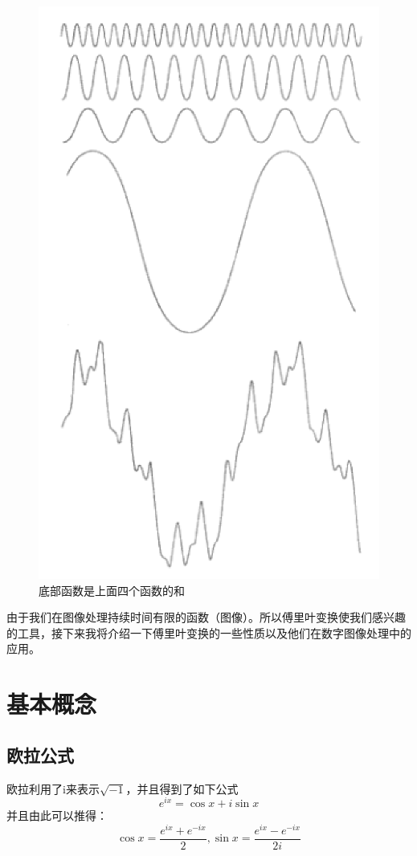\documentclass[UTF8,a4paper]{ctexart}
\begin{document}
\begin{figure}[ht]
	\centering
	\includegraphics[scale=0.6]{pic1.png}
	\caption{底部函数是上面四个函数的和}
\end{figure}
由于我们在图像处理持续时间有限的函数（图像）。所以傅里叶变换使我们感兴趣的工具，接下来我将介绍一下傅里叶变换的一些性质以及他们在数字图像处理中的应用。
\section{基本概念\cite{.2010}}
\subsection{欧拉公式}
欧拉利用了i来表示$\sqrt{-1}$，并且得到了如下公式
\begin{equation}
	e^{i x}=\cos x+i \sin x
\end{equation}
并且由此可以推得：
\begin{equation}
	\cos x=\frac{e^{ix}+e^{-ix}}{2}, \sin x=\frac{e^{ix}-e^{-ix}}{2i}
\end{equation}
\end{document}
